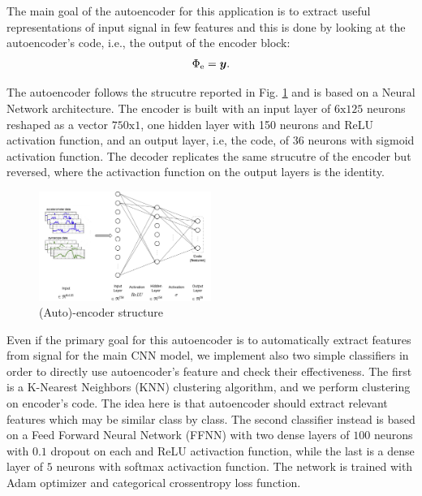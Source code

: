 The main goal of the autoencoder for this application is to extract
useful representations of input signal in few features and this is
done by looking at the autoencoder's code, i.e., the output of the
encoder block:
\begin{equation}
  \Phi_{\text{e}} = \boldsymbol{y}.
\end{equation}

The autoencoder follows the strucutre reported in
Fig. \ref{fig:encoder-structure} and is based on a Neural Network
architecture. The encoder is built with an input layer of
$6\text{x}125$ neurons reshaped as a vector $750\text{x}1$, one hidden
layer with 150 neurons and ReLU activation function, and an output
layer, i.e, the code, of $36$ neurons with sigmoid activation
function. The decoder replicates the same strucutre of the encoder but
reversed, where the activaction function on the output layers is the
identity.
\begin{figure}[h]
  \includegraphics[width=0.5\textwidth]{images/encoder.jpg}
  \caption{(Auto)-encoder structure}
  \label{fig:encoder-structure}
\end{figure}

Even if the primary goal for this autoencoder is to automatically
extract features from signal for the main CNN model, we implement also
two simple classifiers in order to directly use autoencoder's feature
and check their effectiveness.  The first is a K-Nearest Neighbors
(KNN) clustering algorithm, and we perform clustering on encoder's
code. The idea here is that autoencoder should extract relevant
features which may be similar class by class.  The second classifier
instead is based on a Feed Forward Neural Network (FFNN) with two
dense layers of $100$ neurons with $0.1$ dropout on each and ReLU
activaction function, while the last is a dense layer of $5$ neurons
with softmax activaction function. The network is trained with Adam
optimizer and categorical crossentropy loss function.

